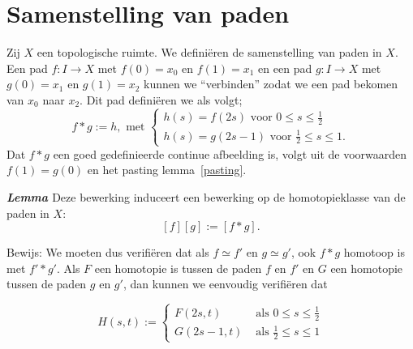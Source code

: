 \documentclass[12pt]{book}
\newcommand{\bew}{{\sc Bewijs: }}
\newenvironment{lem}{\begin{lemh}{\em {\bf Lemma }}}{\end{lemh}}
\begin{document}
%
%
%
%
%
%



\section{Samenstelling van paden}

Zij $X$ een topologische ruimte. We defini\"eren de samenstelling van paden in $X$. Een pad $f:I\to X$ met $f(0)=x_0$ en $f(1)=x_1$ en een pad $g:I\to X$ met $g(0)=x_1$ en $g(1)=x_2$ kunnen we ``verbinden'' zodat we een pad bekomen van $x_0$ naar $x_2$. Dit pad defini\"eren we als volgt;
$$f*g:=h, \mbox{ met } \left\{\begin{array}{l}h(s)=f(2s) \mbox{ voor } 0\leq s\leq
\frac{1}{2} \\ h(s)=g(2s-1) \mbox{ voor } \frac{1}{2} \leq s\leq 1.\end{array}\right.$$
Dat $f*g$ een goed gedefinieerde continue afbeelding is, volgt uit de voorwaarden $f(1)=g(0)$ en het pasting lemma~\ref{pasting}. 


\begin{lem}
Deze bewerking induceert een bewerking op de homotopieklasse van de paden in $X$:
$$[f][g]:=[f*g].$$
\end{lem}
\bew
We moeten dus verifi\"eren dat als $f\simeq f'$ en $g\simeq g'$, ook $f*g$ homotoop is met $f'*g'$. Als $F$ een homotopie is tussen de paden $f$ en $f'$ en $G$  een homotopie tussen de paden $g$ en $g'$, dan kunnen we eenvoudig verifi\"{e}ren dat

$$H(s,t):=\left\{\begin{array}{ll}
F(2s,t) & \mbox{ als } 0\leq s \leq \frac{1}{2}\\
G(2s-1,t) & \mbox{ als } \frac{1}{2} \leq s \leq 1
\end{array}\right.$$
\end{document}
